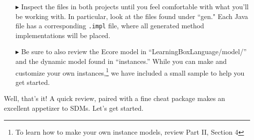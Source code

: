 \begin{itemize}
	
\itemWithRightTriangle In order to start working with the cheat package, you have to generate code by (i) opening the \texttt{.eap} file in \texttt{LeitnersLearningBox}, (ii) exporting it using Enterprise Architect, (iii) refreshing the project containing the \texttt{.eap} and (iv) rebuilding the  \texttt{LearningBoxLanguage} project. For more details on the code generation process, refer to Part I, Section 2.

\item[$\blacktriangleright$] Inspect the files in both projects until you feel comfortable with what you'll be working with. In particular, look at the files
found under ``gen." Each Java file has a corresponding \texttt{.impl} file, where all generated method implementations will be placed.

\item[$\blacktriangleright$] Be sure to also review the Ecore model in ``LearningBoxLanguage/model/'' and the dynamic model found in ``instances.'' While
you can make and customize your own instances,\footnote{To learn how to make your own instance models, review Part II, Section 4} we have included a small
sample to help you get started.

\end{itemize}

Well, that's it! A quick review, paired with a fine cheat package makes an excellent appetizer to SDMs. Let's get started.